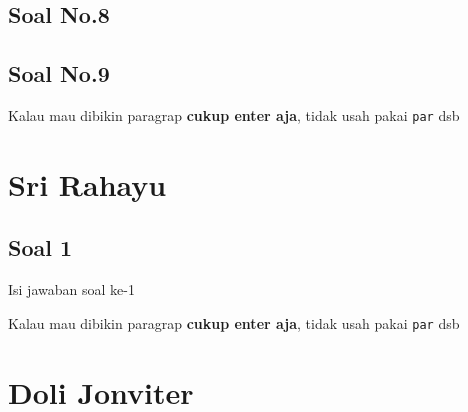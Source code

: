 \begin{enumerate}
\subsection{Soal No.8}


\subsection{Soal No.9}


\end{enumerate}

Kalau mau dibikin paragrap \textbf{cukup enter aja}, tidak usah pakai \verb|par| dsb



\section{Sri Rahayu}
\subsection{Soal 1}
Isi jawaban soal ke-1

Kalau mau dibikin paragrap \textbf{cukup enter aja}, tidak usah pakai \verb|par| dsb



\section{Doli Jonviter}
